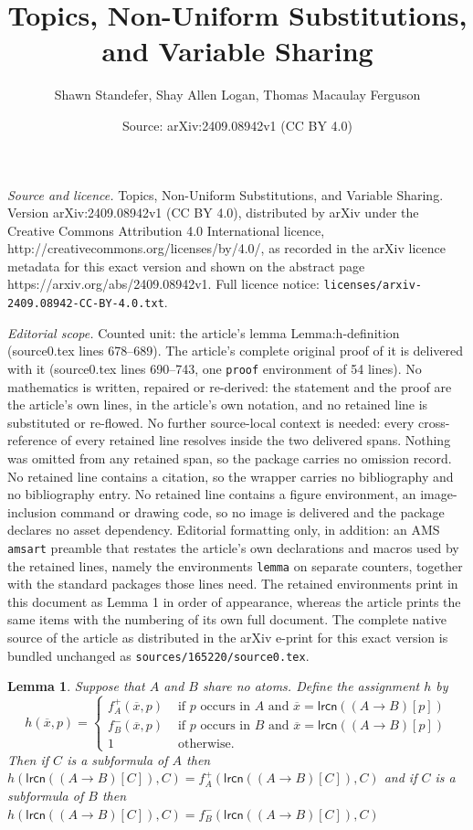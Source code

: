 \documentclass[10pt,a4paper]{amsart}
\title{Topics, Non-Uniform Substitutions, and Variable Sharing}
\author{Shawn Standefer, Shay Allen Logan, Thomas Macaulay Ferguson}
\date{Source: arXiv:2409.08942v1 (CC BY 4.0)}
\newtheorem{lemma}{Lemma}
\newcommand{\lrcn}{\mathsf{lrcn}}
\begin{document}
\maketitle

\noindent\emph{Source and licence.} Topics, Non-Uniform Substitutions, and Variable Sharing. Version arXiv:2409.08942v1 (CC BY 4.0), distributed by arXiv under the Creative Commons Attribution 4.0 International licence, http://creativecommons.org/licenses/by/4.0/, as recorded in the arXiv licence metadata for this exact version and shown on the abstract page https://arxiv.org/abs/2409.08942v1. Full licence notice: \texttt{licenses/arxiv-2409.08942-CC-BY-4.0.txt}.\par\smallskip

\noindent\textit{Editorial scope.} Counted unit: the article's lemma Lemma:h-definition (source0.tex lines 678--689). The article's complete original proof of it is delivered with it (source0.tex lines 690--743, one \texttt{proof} environment of 54 lines). No mathematics is written, repaired or re-derived: the statement and the proof are the article's own lines, in the article's own notation, and no retained line is substituted or re-flowed.  No further source-local context is needed: every cross-reference of every retained line resolves inside the two delivered spans.  Nothing was omitted from any retained span, so the package carries no omission record.  No retained line contains a citation, so the wrapper carries no bibliography and no bibliography entry.  No retained line contains a figure environment, an image-inclusion command or drawing code, so no image is delivered and the package declares no asset dependency.  Editorial formatting only, in addition: an AMS \texttt{amsart} preamble that restates the article's own declarations and macros used by the retained lines, namely the environments \texttt{lemma} on separate counters, together with the standard packages those lines need.  The retained environments print in this document as Lemma 1 in order of appearance, whereas the article prints the same items with the numbering of its own full document.  The complete native source of the article as distributed in the arXiv e-print for this exact version is bundled unchanged as \texttt{sources/165220/source0.tex}.
\begin{lemma}\label{Lemma:h-definition}
    Suppose that $A$ and $B$ share no atoms. Define the assignment $h$ by
    \[
        h(\overline{x},p)=\left\{
        \begin{array}{rl}
            f^+_A(\overline{x}, p) & \text{ if } p \text{ occurs in $A$ and $\overline{x}=\lrcn((A\to B)[p])$} \\
            f^-_B(\overline{x}, p) & \text{ if } p \text{ occurs in $B$ and $\overline{x}=\lrcn((A\to B)[p])$} \\
            1 & \text{ otherwise}.
        \end{array}\right.
    \]
    Then if $C$ is a subformula of $A$ then $h(\lrcn((A\to B)[C]),C)=f^+_A(\lrcn((A\to B)[C]),C)$ and if $C$ is a subformula of $B$ then $h(\lrcn((A\to B)[C]),C)=f^-_B(\lrcn((A\to B)[C]),C)$
\end{lemma}
\end{document}
